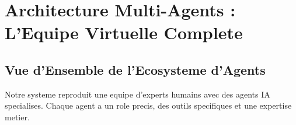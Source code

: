 \documentclass[a4paper,12pt]{article}
\begin{document}
\section{Architecture Multi-Agents : L'Equipe Virtuelle Complete}

\subsection{Vue d'Ensemble de l'Ecosysteme d'Agents}

Notre systeme reproduit une equipe d'experts humains avec des agents IA specialises. Chaque agent a un role precis, des outils specifiques et une expertise metier.
\end{document}
